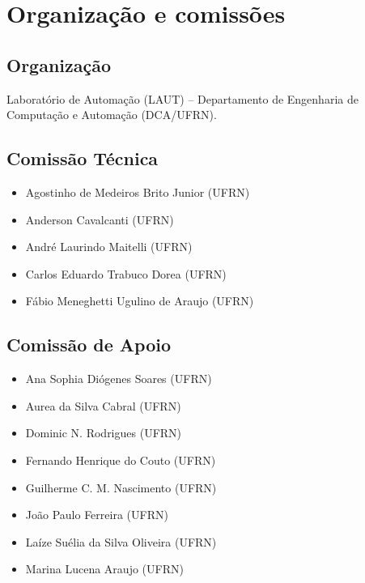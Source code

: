 \documentclass[12pt,a4paper,oneside,openany]{book}
\begin{document}
\chapter*{Organização e comissões}

\section*{Organização}
Laboratório de Automação (LAUT) -- Departamento de Engenharia de Computação e
Automação (DCA/UFRN).

\section*{Comissão Técnica}
\begin{itemize}[itemsep=1pt,topsep=2pt]
  \item Agostinho de Medeiros Brito Junior (UFRN)
  \item Anderson Cavalcanti (UFRN)
  \item André Laurindo Maitelli (UFRN)
  \item Carlos Eduardo Trabuco Dorea (UFRN)
  \item Fábio Meneghetti Ugulino de Araujo (UFRN) %
\end{itemize}

\section*{Comissão de Apoio}
\begin{itemize}[itemsep=1pt,topsep=2pt]
  \item Ana Sophia Diógenes Soares (UFRN) %
  \item Aurea da Silva Cabral (UFRN)
  \item Dominic N. Rodrigues (UFRN)
  \item Fernando Henrique do Couto (UFRN)
  \item Guilherme C. M. Nascimento (UFRN)
  \item João Paulo Ferreira (UFRN)
  \item Laíze Suélia da Silva Oliveira (UFRN)
  \item Marina Lucena Araujo (UFRN)
\end{itemize}

\end{document}
